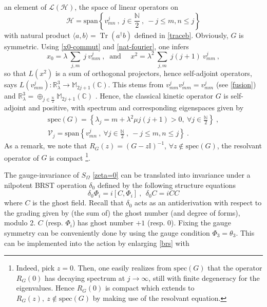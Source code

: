 \documentclass[a4paper,11pt,twoside]{article}
\numberwithin{equation}{section}
\newcommand\bbone{{ \mathbb{I}}}
\DeclareMathOperator{\tr}{Tr}
\theoremstyle{nonumberplain}
\newcounter{and}
\begin{document}
%
an element of $\mathcal{L}(\mathcal{H})$, the space of linear operators on 
\begin{equation*}
\mathcal{H}=\text{span}\left\{v^j_{mn} \ , \ j\in\frac{\mathbb{N}}{2} \ , \ -j\le m,n\le j\right\} 
\end{equation*}
%
with natural product $\langle a,b \rangle = \tr(a^\dag b)$ defined in \eqref{traceb}. Obviously, $G$ is symmetric. Using \eqref{x0-commut} and \eqref{nat-fourier}, one infers%
%
\begin{equation}
x_0 = \lambda \ \sum_{j,m} \ j \ v^j_{mm} \ , \ \mbox{ and } \quad x^2 = \lambda^2 \ \sum_{j,m} \ j(j+1) \ v^j_{mm} \ ,
\end{equation}
%
so that $L(x^2)$ is a sum of orthogonal projectors, hence self-adjoint operators, says $L(v^j_{mm}):\mathbb{R}^3_\lambda\to\mathbb{M}_{2j+1}(\mathbb{C})$. This stems from $v^j_{mm}v^j_{mm}=v^j_{mm}$ (see \eqref{fusion}) and $\mathbb{R}^3_\lambda=\oplus_{j\in\frac{\mathbb{N}}{2}}\mathbb{M}_{2j+1}(\mathbb{C})$ \cite{vit-wal-12}. Hence, the classical kinetic operator $G$ is self-adjoint and positive, with spectrum and corresponding eigenspaces given by%
%
\begin{eqnarray}
&\text{spec}(G)=\left\{ \lambda_j = m + \lambda^2 \mu j(j+1) >0 , \ \forall j \in \frac{\mathbb{N}}{2} \right\} \ , \label{spect-G}& \\
&\mathcal{V}_{j} = \text{span}\left\{ v^j_{mn} \ , \ \forall  j \in \frac{\mathbb{N}}{2} \ , \ -j\le m,n\le j \right\} \ . \label{eigensp-G}&
\end{eqnarray}
%
As a remark, we note that $R_G(z)=(G-z\bbone)^{-1}$, $\forall z\notin\text{spec}(G)$, the resolvant operator of $G$ is compact {\footnote{Indeed, pick $z=0$. Then, one easily realizes from $\text{spec}(G)$ that the operator $R_G(0)$ has decaying spectrum at $j\to\infty$, still with finite degeneracy for the eigenvalues. Hence $R_G(0)$ is compact which extends to $R_G(z),\ z\notin\text{spec}(G)$ by making use of the resolvant equation.}}.\par%
%
The gauge-invariance of $S_\Omega$ \eqref{zeta=0} can be translated into invariance under a nilpotent BRST operation $\delta_0$ defined by the following structure equations \cite{MVW13}%
%
\begin{equation}
\delta_0 \Phi_i = i \left[C,\Phi_i\right] \ , \ \ \delta_0C=iCC\label{brs}
\end{equation}
%
where $C$ is the ghost field. Recall that $\delta_0$ acts as an antiderivation with respect to the grading given by (the sum of) the ghost number (and degree of forms), modulo 2. $C$ (resp. $\Phi_i$) has ghost number $+1$ (resp. $0$). Fixing the gauge symmetry can be conveniently done by using the gauge condition $\Phi_3=\theta_3$. This can be implemented into the action by enlarging \eqref{brs} with%
\end{document}
